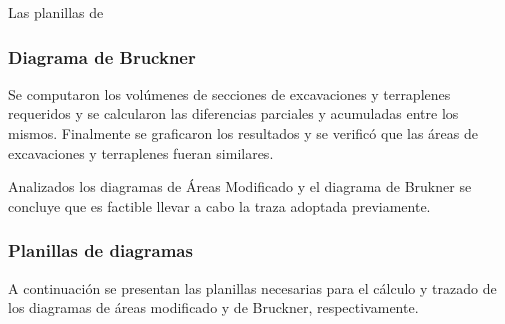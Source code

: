 \documentclass[../main.tex]{subfiles}
\begin{document}
Las planillas de 

\subsubsection{Diagrama de Bruckner}

Se computaron los volúmenes de secciones de excavaciones y terraplenes requeridos y se calcularon las diferencias parciales y acumuladas entre los mismos. Finalmente se graficaron los resultados y se verificó que las áreas de excavaciones y terraplenes fueran similares. 

Analizados los diagramas de Áreas Modificado y el diagrama de Brukner se concluye que es factible llevar a cabo la traza adoptada previamente. 

\subsubsection{Planillas de diagramas}

A continuación se presentan las planillas necesarias para el cálculo y trazado de los diagramas de áreas modificado y de Bruckner, respectivamente.

\clearpage



\clearpage


\end{document}
